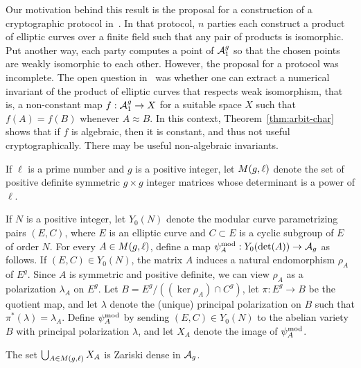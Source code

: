 \documentclass{amsart}
\begin{document}
Our motivation behind this result is the proposal for a construction of a cryptographic protocol in~\cite{multiparty}. In that protocol, $n$ parties each construct a product of elliptic curves over a finite field such that any pair of products is isomorphic. Put another way, each party computes a point of $\mathcal{A}_1^g$ so that the chosen points are weakly isomorphic to each other. However, the proposal for a protocol was incomplete. The open question in~\cite{multiparty} was whether one can extract a numerical invariant of the product of elliptic curves that respects weak isomorphism, that is, a non-constant map $f: \mathcal{A}_1^g \to X$ for a suitable space $X$ such that $f(A) = f(B)$ whenever $A \approx B$. In this context, Theorem~\ref{thm:arbit-char} shows that if $f$ is algebraic, then it is constant, and thus not useful cryptographically. There may be useful non-algebraic invariants. %


\begin{definition}\label{def:detl}
If $\ell$ is a prime number and $g$ is a positive integer, let $M(g,\ell)$ denote the set of positive definite symmetric $g \times g$ integer matrices whose determinant is a power of $\ell$.
\end{definition}

If $N$ is a positive integer, let $Y_0(N)$ denote the modular curve parametrizing pairs $(E, C)$, where $E$ is an elliptic curve and $C \subset E$ is a cyclic subgroup of $E$ of order $N$. For every $A \in M(g,\ell)$, define a map $\psi_{A}^\mathrm{mod}: Y_0(\det(A)) \to \mathcal{A}_g$ as follows. If $(E, C) \in Y_0(N)$, the matrix $A$ induces a natural endomorphism $\rho_A$ of $E^g$. Since $A$ is symmetric and positive definite, we can view $\rho_A$ as a polarization $\lambda_A$ on $E^g$. Let $B = E^g/((\ker \rho_A) \cap C^g)$, let $\pi: E^g \to B$ be the quotient map, and let $\lambda$ denote the (unique) principal polarization on $B$ such that $\pi^*(\lambda) = \lambda_A$. Define $\psi_{A}^\mathrm{mod}$ by sending $(E,C) \in Y_0(N)$ to the abelian variety $B$ with principal polarization $\lambda$, and let $X_A$ denote the image of $\psi_{A}^\mathrm{mod}$.

\begin{theorem}\label{thm:curves-dense}
  The set $\bigcup_{A \in M(g,\ell)} X_A$ is Zariski dense in $\mathcal{A}_g$.
\end{theorem}
\end{document}
